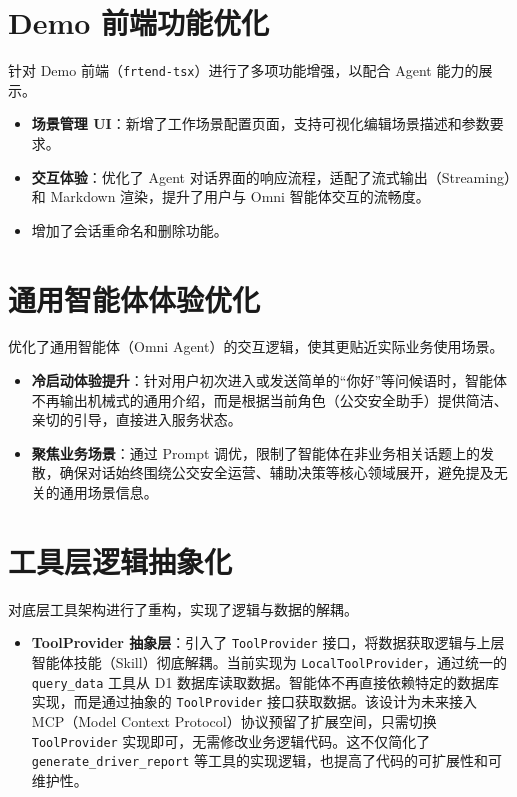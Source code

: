 \documentclass[UTF8]{ctexart}
\begin{document}
\section{Demo 前端功能优化}

针对 Demo 前端（\texttt{frtend-tsx}）进行了多项功能增强，以配合 Agent 能力的展示。

\begin{itemize}
    \item \textbf{场景管理 UI}：新增了工作场景配置页面，支持可视化编辑场景描述和参数要求。
    \item \textbf{交互体验}：优化了 Agent 对话界面的响应流程，适配了流式输出（Streaming）和 Markdown 渲染，提升了用户与 Omni 智能体交互的流畅度。
    \item 增加了会话重命名和删除功能。
\end{itemize}

\section{通用智能体体验优化}

优化了通用智能体（Omni Agent）的交互逻辑，使其更贴近实际业务使用场景。

\begin{itemize}
    \item \textbf{冷启动体验提升}：针对用户初次进入或发送简单的“你好”等问候语时，智能体不再输出机械式的通用介绍，而是根据当前角色（公交安全助手）提供简洁、亲切的引导，直接进入服务状态。
    \item \textbf{聚焦业务场景}：通过 Prompt 调优，限制了智能体在非业务相关话题上的发散，确保对话始终围绕公交安全运营、辅助决策等核心领域展开，避免提及无关的通用场景信息。
\end{itemize}

\section{工具层逻辑抽象化}

对底层工具架构进行了重构，实现了逻辑与数据的解耦。

\begin{itemize}
    \item \textbf{ToolProvider 抽象层}：引入了 \texttt{ToolProvider} 接口，将数据获取逻辑与上层智能体技能（Skill）彻底解耦。当前实现为 \texttt{LocalToolProvider}，通过统一的 \texttt{query\_data} 工具从 D1 数据库读取数据。智能体不再直接依赖特定的数据库实现，而是通过抽象的 \texttt{ToolProvider} 接口获取数据。该设计为未来接入 MCP（Model Context Protocol）协议预留了扩展空间，只需切换 \texttt{ToolProvider} 实现即可，无需修改业务逻辑代码。这不仅简化了 \texttt{generate\_driver\_report} 等工具的实现逻辑，也提高了代码的可扩展性和可维护性。
\end{itemize}
\end{document}
